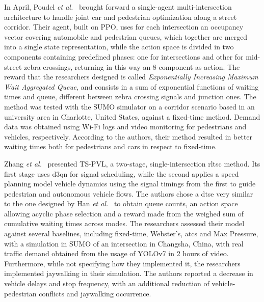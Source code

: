 In April, Poudel \textit{et al.}~\cite{Poudel2025} brought forward a single-agent multi-intersection architecture to handle joint car and pedestrian optimization along a street corridor. Their agent, built on PPO, uses for each intersection an occupancy vector covering automobile and pedestrian queues, which together are merged into a single state representation, while the action space is divided in two components containing predefined phases: one for intersections and other for mid-street zebra crossings, returning in this way an 8-component as action. The reward that the researchers designed is called \textit{Exponentially Increasing Maximum Wait Aggregated Queue}, and consists in a sum of exponential functions of waiting times and queue, different between zebra crossing signals and junction ones. The method was tested with the SUMO simulator on a corridor scenario based in an university area in Charlotte, United States, against a fixed-time method. Demand data was obtained using Wi-Fi logs and video monitoring for pedestrians and vehicles, respectively. According to the authors, their method resulted in better waiting times both for pedestrians and cars in respect to fixed-time.

Zhang \textit{et al.}~\cite{Zhang2025b} presented TS-PVL, a two-stage, single-intersection \gls{rltsc} method. Its first stage uses \gls{d3qn} for signal scheduling, while the second applies a speed planning model vehicle dynamics using the signal timings from the first to guide pedestrian and autonomous vehicle flows. The authors chose a \gls{dtse} very similar to the one designed  by Han \textit{et al.}~\cite{Han2022} to obtain queue counts, an action space allowing acyclic phase selection and a reward made from the weighed sum of cumulative waiting times across modes. The researchers assessed their model against several baselines, including fixed-time, Webster's, \gls{atcs} and Max Pressure, with a simulation in SUMO of an intersection in Changsha, China, with real traffic demand obtained from the usage of YOLOv7 in 2 hours of video. Furthermore, while not specifying how they implemented it, the researchers implemented jaywalking in their simulation. The authors reported a decrease in vehicle delays and stop frequency, with an additional reduction of vehicle-pedestrian conflicts and jaywalking occurrence.

